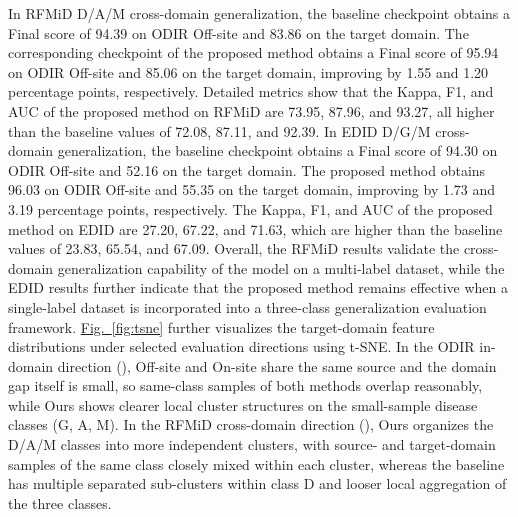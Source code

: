 In RFMiD D/A/M cross-domain generalization, the baseline checkpoint obtains a Final score of 94.39 on ODIR Off-site and 83.86 on the target domain. The corresponding checkpoint of the proposed method obtains a Final score of 95.94 on ODIR Off-site and 85.06 on the target domain, improving by 1.55 and 1.20 percentage points, respectively. Detailed metrics show that the Kappa, F1, and AUC of the proposed method on RFMiD are 73.95, 87.96, and 93.27, all higher than the baseline values of 72.08, 87.11, and 92.39. In EDID D/G/M cross-domain generalization, the baseline checkpoint obtains a Final score of 94.30 on ODIR Off-site and 52.16 on the target domain. The proposed method obtains 96.03 on ODIR Off-site and 55.35 on the target domain, improving by 1.73 and 3.19 percentage points, respectively. The Kappa, F1, and AUC of the proposed method on EDID are 27.20, 67.22, and 71.63, which are higher than the baseline values of 23.83, 65.54, and 67.09. Overall, the RFMiD results validate the cross-domain generalization capability of the model on a multi-label dataset, while the EDID results further indicate that the proposed method remains effective when a single-label dataset is incorporated into a three-class generalization evaluation framework. \hyperref[fig:tsne]{Fig.~\ref*{fig:tsne}} further visualizes the target-domain feature distributions under selected evaluation directions using t-SNE. In the ODIR in-domain direction (), Off-site and On-site share the same source and the domain gap itself is small, so same-class samples of both methods overlap reasonably, while Ours shows clearer local cluster structures on the small-sample disease classes (G, A, M). In the RFMiD cross-domain direction (), Ours organizes the D/A/M classes into more independent clusters, with source- and target-domain samples of the same class closely mixed within each cluster, whereas the baseline has multiple separated sub-clusters within class D and looser local aggregation of the three classes.

